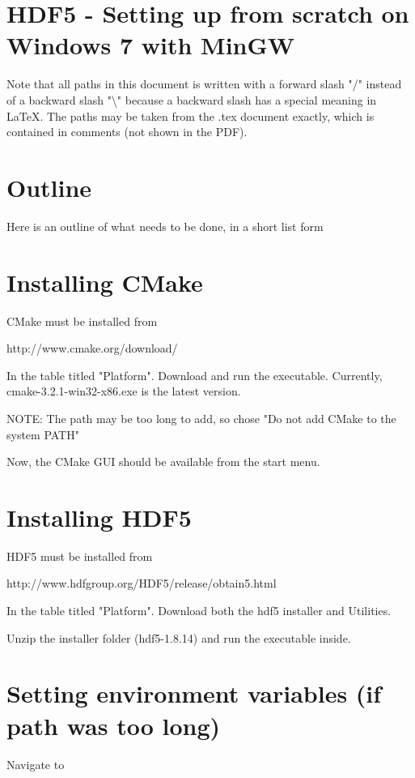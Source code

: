 \documentclass[11pt]{article}
\begin{document}
\doublespacing
\MOONSTITLE
\maketitle

\section{HDF5 - Setting up from scratch on Windows 7 with MinGW}
Note that all paths in this document is written with a forward slash "/" instead of a backward slash "\textbackslash" because a backward slash has a special meaning in LaTeX. The paths may be taken from the .tex document exactly, which is contained in comments (not shown in the PDF).

\section{Outline}
Here is an outline of what needs to be done, in a short list form

\section{Installing CMake}
CMake must be installed from

http://www.cmake.org/download/

In the table titled "Platform". Download and run the executable. Currently, cmake-3.2.1-win32-x86.exe is the latest version.

NOTE: The path may be too long to add, so chose "Do not add CMake to the system PATH"

Now, the CMake GUI should be available from the start menu.

\section{Installing HDF5}

HDF5 must be installed from

http://www.hdfgroup.org/HDF5/release/obtain5.html

In the table titled "Platform". Download both the hdf5 installer and Utilities.

Unzip the installer folder (hdf5-1.8.14) and run the executable inside.

\section{Setting environment variables (if path was too long)}
Navigate to 
\end{document}
